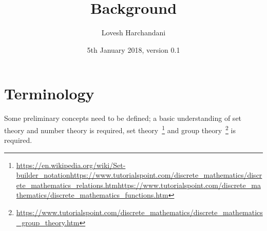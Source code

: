 \documentclass[a4paper]{article}
\title{Background}
\author{Lovesh Harchandani}
\date{5th January 2018, version 0.1}
\begin{document}
\maketitle

\section{Terminology}

Some preliminary concepts need to be defined; a basic understanding of set theory and number theory is required, set theory~\footnote{\url{https://en.wikipedia.org/wiki/Set-builder_notation}\newline \url{https://www.tutorialspoint.com/discrete_mathematics/discrete_mathematics_relations.htm}\newline \url{https://www.tutorialspoint.com/discrete_mathematics/discrete_mathematics_functions.htm}} and group theory~\footnote{\url{https://www.tutorialspoint.com/discrete_mathematics/discrete_mathematics_group_theory.htm}} is required. 
\newline
\end{document}
